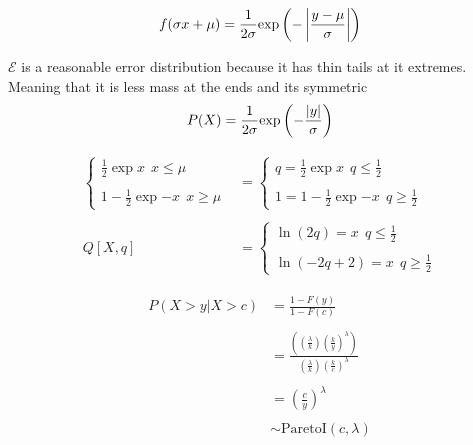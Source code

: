 \documentclass[12pt]{article}
\begin{document}
\begin{enumerate}
\begin{align*}
    f(\sigma x + \mu) = \frac{1}{2 \sigma} \mathrm{exp}\left(-\left|\frac{y - \mu}{\sigma}\right|\right) 
\end{align*}


$\mathcal{E}$ is a reasonable error distribution because it has thin tails at it extremes. Meaning that it is less mass at the ends and its symmetric
\begin{align*}
    P(X) = \frac{1}{2\sigma} \mathrm{exp}\left(-\frac{\left|y\right|}{\sigma}\right)
\end{align*}


\begin{align*}
    \begin{cases}
        \frac{1}{2} \exp{x} ~~ x \leq \mu \\ \\ 
        1 - \frac{1}{2} \exp{-x} ~~ x \geq \mu 
    \end{cases} &=
    \begin{cases}
        q = \frac{1}{2} \exp{x}  ~~ q \leq \frac{1}{2}\\ \\ 
        1 = 1 - \frac{1}{2} \exp{-x} ~~  q \geq \frac{1}{2} 
    \end{cases} \\ \\ 
   Q[X, q] &= \begin{cases}
        \ln(2q) = x ~~ q \leq \frac{1}{2}\\ \\
        \ln(-2q + 2) = x ~~ q \geq \frac{1}{2}
    \end{cases}
\end{align*}




\begin{align*}
    P(X > y | X > c) &= \frac{1 - F(y)}{1 - F(c)} \\ \\ 
    &= \frac{((\frac{\lambda}{k}) (\frac{k}{y})^{\lambda})}{ (\frac{\lambda}{k}) (\frac{k}{c})^{\lambda}} \\ \\ 
    &= (\frac{c}{y})^{\lambda} \\ \\ 
    &\sim \text{ParetoI}(c, \lambda)
\end{align*}


\end{enumerate}
\end{document}
